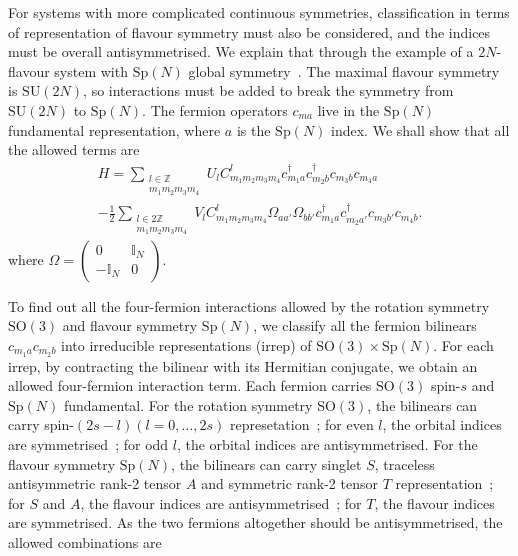 \documentclass{timesjhep}
\begin{document}
For systems with more complicated continuous symmetries, classification in terms of representation of flavour symmetry must also be considered, and the indices must be overall antisymmetrised. We explain that through the example of a $2N$-flavour system with $\mathrm{Sp}(N)$ global symmetry~\cite{Zhou2024Oct}. The maximal flavour symmetry is $\mathrm{SU}(2N)$, so interactions must be added to break the symmetry from $\mathrm{SU}(2N)$ to $\mathrm{Sp}(N)$. The fermion operators $c_{ma}$ live in the $\mathrm{Sp}(N)$ fundamental representation, where $a$ is the $\mathrm{Sp}(N)$ index. We shall show that all the allowed terms are 
\begin{multline}
    H=\sum_{\substack{l\in\mathbb{Z}\\m_1m_2m_3m_4}}U_lC^l_{m_1m_2m_3m_4}c^\dagger_{m_1a}c^\dagger_{m_2b}c_{m_3b}c_{m_4a}\\
    -\frac{1}{2}\sum_{\substack{l\in 2\mathbb{Z}\\m_1m_2m_3m_4}}V_lC^l_{m_1m_2m_3m_4}\Omega_{aa'}\Omega_{bb'}c^\dagger_{m_1a}c^\dagger_{m_2a'}c_{m_3b'}c_{m_4b}.
\end{multline} 
where $\Omega=\begin{pmatrix}0&\mathbb{I}_N\\-\mathbb{I}_N&0\end{pmatrix}$. 

To find out all the four-fermion interactions allowed by the rotation symmetry $\mathrm{SO}(3)$ and flavour symmetry $\mathrm{Sp}(N)$, we classify all the fermion bilinears $c_{m_1a}c_{m_2b}$ into irreducible representations (irrep) of $\mathrm{SO}(3)\times\mathrm{Sp}(N)$. For each irrep, by contracting the bilinear with its Hermitian conjugate, we obtain an allowed four-fermion interaction term. Each fermion carries $\mathrm{SO}(3)$ spin-$s$ and $\mathrm{Sp}(N)$ fundamental. For the rotation symmetry $\mathrm{SO}(3)$, the bilinears can carry spin-$(2s-l)(l=0,\dots,2s)$ represetation~; for even $l$, the orbital indices are symmetrised~; for odd $l$, the orbital indices are antisymmetrised. For the flavour symmetry $\mathrm{Sp}(N)$, the bilinears can carry singlet $S$, traceless antisymmetric rank-2 tensor $A$ and symmetric rank-2 tensor $T$ representation~; for $S$ and $A$, the flavour indices are antisymmetrised~; for $T$, the flavour indices are symmetrised. As the two fermions altogether should be antisymmetrised, the allowed combinations are 
\end{document}
